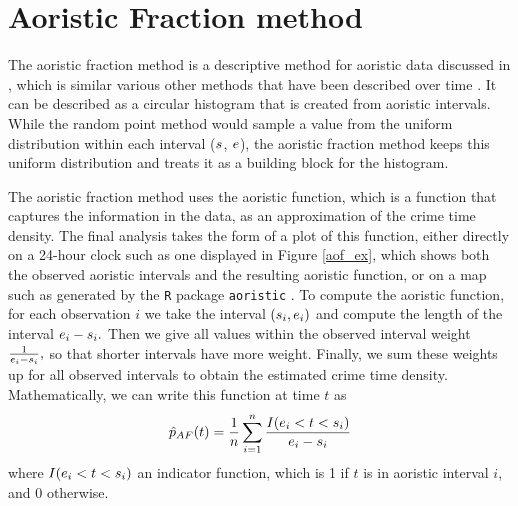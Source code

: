 \section{Aoristic Fraction method} \label{afmethod}

The aoristic fraction method is a descriptive method for aoristic data discussed in \citet{ratcliffe1998aoristic}, which is similar various other methods that have been described over time \citep{gottlieb1994crime, rayment1995spatial, brown1998regional}. It can be described as a circular histogram that is created from aoristic intervals. While the random point method would sample a value from the uniform distribution within each interval ($s$, $e$), the aoristic fraction method keeps this uniform distribution and treats it as a building block for the histogram.

The aoristic fraction method uses the aoristic function, which is a function that captures the information in the data, as an approximation of the crime time density. The final analysis takes the form of a plot of this function, either directly on a 24-hour clock such as one displayed in Figure \ref{aof_ex}, which shows both the observed aoristic intervals and the resulting aoristic function, or on a map such as generated by the \texttt{R} package \texttt{aoristic} \citep{kikuchi2015package}. To compute the aoristic function, for each observation $i$ we take the interval $(s_i, e_i)$ and compute the length of the interval $e_i - s_i.$ Then we give all values within the observed interval weight $\frac{1}{e_i - s_i},$ so that shorter intervals have more weight. Finally, we sum these weights up for all observed intervals to obtain the estimated crime time density. Mathematically, we can write this function at time $t$ as
\begin{equation}
\hat{p}_{AF}(t) = \frac{1}{n}\sum_{i=1}^n \frac{I(e_i < t < s_i)}{e_i - s_i}
\end{equation}
where $I(e_i < t < s_i)$ an indicator function, which is 1 if $t$ is in aoristic interval $i$, and 0 otherwise.


